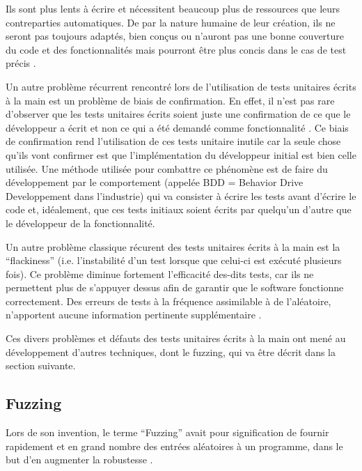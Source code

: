 \documentclass[a4paper]{report}
\begin{document}
Ils sont plus lents à écrire et nécessitent beaucoup plus de ressources que leurs contreparties automatiques.
De par la nature humaine de leur création, ils ne seront pas toujours adaptés, bien conçus ou n'auront pas une bonne couverture du code et des fonctionnalités mais pourront être plus concis dans le cas de test précis \cite{Zhu1997}.

Un autre problème récurrent rencontré lors de l'utilisation de tests unitaires écrits à la main est un problème de biais de confirmation.
En effet, il n'est pas rare d'observer que les tests unitaires écrits soient juste une confirmation de ce que le développeur a écrit et non ce qui a été demandé comme fonctionnalité \cite{Calikli2014}.
Ce biais de confirmation rend l'utilisation de ces tests unitaire inutile car la seule chose qu'ils vont confirmer est que l'implémentation du développeur initial est bien celle utilisée.
Une méthode utilisée pour combattre ce phénomène est de faire du développement par le comportement (appelée BDD = Behavior Drive Developpement dans l'industrie) qui va consister à écrire les tests avant d'écrire le code et, idéalement, que ces tests initiaux soient écrits par quelqu'un d'autre que le développeur de la fonctionnalité.

Un autre problème classique récurent des tests unitaires écrits à la main est la “flackiness” (i.e. l'instabilité d'un test lorsque que celui-ci est exécuté plusieurs fois).
Ce problème diminue fortement l'efficacité des-dits tests, car ils ne permettent plus de s'appuyer dessus afin de garantir que le software fonctionne correctement.
Des erreurs de tests à la fréquence assimilable à de l'aléatoire, n'apportent aucune information pertinente supplémentaire \cite{Luo2014}.


Ces divers problèmes et défauts des tests unitaires écrits à la main ont mené au développement d’autres techniques, dont le fuzzing, qui va être décrit dans la section suivante.

\subsection{Fuzzing}

Lors de son invention, le terme “Fuzzing” avait pour signification de fournir rapidement et en grand nombre des entrées aléatoires à un programme, dans le but d'en augmenter la robustesse \cite{Forrester2000}.
\end{document}
